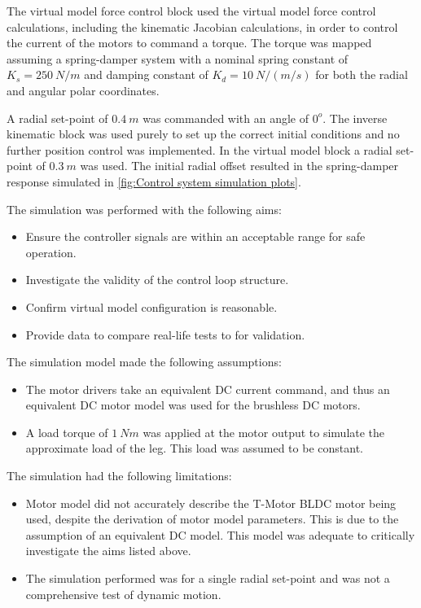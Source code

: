 The virtual model force control block used the virtual model force control calculations, including the kinematic Jacobian calculations, in order to control the current of the motors to command a torque. The torque was mapped assuming a spring-damper system with a nominal spring constant of $K_s = 250\ N/m$ and damping constant of $K_d = 10\ N/(m/s)$ for both the radial and angular polar coordinates.

A radial set-point of $0.4\ m$ was commanded with an angle of $0^o$. The inverse kinematic block was used purely to set up the correct initial conditions and no further position control was implemented. In the virtual model block a radial set-point of $0.3\ m$ was used. The initial radial offset resulted in the spring-damper response simulated in \cref{fig:Control system simulation plots}.

The simulation was performed with the following aims:
\begin{itemize}
\item Ensure the controller signals are within an acceptable range for safe operation.
\item Investigate the validity of the control loop structure.
\item Confirm virtual model configuration is reasonable.
\item Provide data to compare real-life tests to for validation.
\end{itemize}

The simulation model made the following assumptions:
\begin{itemize}
\item The motor drivers take an equivalent DC current command, and thus an equivalent DC motor model was used for the brushless DC motors.
\item A load torque of $1\ Nm$ was applied at the motor output to simulate the approximate load of the leg. This load was assumed to be constant.
\end{itemize}

The simulation had the following limitations:
\begin{itemize}
\item Motor model did not accurately describe the T-Motor BLDC motor being used, despite the derivation of motor model parameters. This is due to the assumption of an equivalent DC model. This model was adequate to critically investigate the aims listed above.
\item The simulation performed was for a single radial set-point and was not a comprehensive test of dynamic motion.
\end{itemize}

